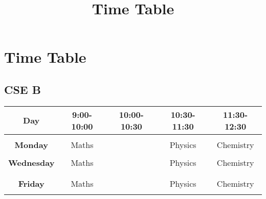 \documentclass[a4paper,12pt]{article}
\begin{document}
	\title{Time Table}
	\section{Time Table}
		\subsection{CSE B}
	\begin{table}[h]
		\begin{tabular}{|c|c|c|c|c|}
			\hline
			\textbf{Day}&9:00-10:00&10:00-10:30&10:30-11:30&11:30-12:30\\
			\hline
			 & & & & \\
			\textbf{Monday}&Maths&&Physics&Chemistry\\
			 & & & & \\
			\cline{1-2}
			\cline{4-5}
			\textbf{Wednesday}&Maths&\rotatebox{90}{Break}&Physics&Chemistry\\
			 & & & & \\
			\cline{1-2}
			\cline{4-5}
			 & & & & \\
			\textbf{Friday}&Maths&&Physics&Chemistry\\
			 & & & & \\
			\hline
		\end{tabular}
	\end{table}
\end{document}
